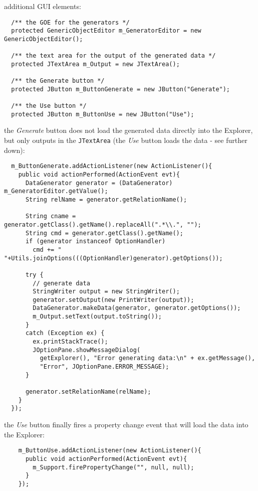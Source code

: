 \begin{tight_itemize}
  \newpage
  \item additional GUI elements:
  \begin{verbatim}
  /** the GOE for the generators */
  protected GenericObjectEditor m_GeneratorEditor = new GenericObjectEditor();

  /** the text area for the output of the generated data */
  protected JTextArea m_Output = new JTextArea();

  /** the Generate button */
  protected JButton m_ButtonGenerate = new JButton("Generate");

  /** the Use button */
  protected JButton m_ButtonUse = new JButton("Use");
  \end{verbatim}

  \item the \textit{Generate} button does not load the generated data directly
into the Explorer, but only outputs in the \texttt{JTextArea} (the \textit{Use}
button loads the data - see further down):
  \begin{verbatim}
  m_ButtonGenerate.addActionListener(new ActionListener(){
    public void actionPerformed(ActionEvent evt){
      DataGenerator generator = (DataGenerator) m_GeneratorEditor.getValue();
      String relName = generator.getRelationName();

      String cname = generator.getClass().getName().replaceAll(".*\\.", "");
      String cmd = generator.getClass().getName();
      if (generator instanceof OptionHandler)
        cmd += " "+Utils.joinOptions(((OptionHandler)generator).getOptions());

      try {
        // generate data
        StringWriter output = new StringWriter();
        generator.setOutput(new PrintWriter(output));
        DataGenerator.makeData(generator, generator.getOptions());
        m_Output.setText(output.toString());
      }
      catch (Exception ex) {
        ex.printStackTrace();
        JOptionPane.showMessageDialog(
          getExplorer(), "Error generating data:\n" + ex.getMessage(),
          "Error", JOptionPane.ERROR_MESSAGE);
      }

      generator.setRelationName(relName);
    }
  });
  \end{verbatim}

  \item the \textit{Use} button finally fires a property change event that will
load the data into the Explorer:
  \begin{verbatim}
    m_ButtonUse.addActionListener(new ActionListener(){
      public void actionPerformed(ActionEvent evt){
        m_Support.firePropertyChange("", null, null);
      }
    });
  \end{verbatim}


\end{tight_itemize}
